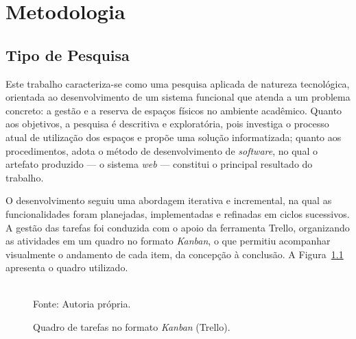 \chapter{Metodologia}\label{chp:METODOLOGIA}




\section{Tipo de Pesquisa}\label{sec:tipoPesquisa}


Este trabalho caracteriza-se como uma pesquisa aplicada de natureza tecnológica, orientada ao desenvolvimento de um sistema funcional que atenda a um problema concreto: a gestão e a reserva de espaços físicos no ambiente acadêmico. Quanto aos objetivos, a pesquisa é descritiva e exploratória, pois investiga o processo atual de utilização dos espaços e propõe uma solução informatizada; quanto aos procedimentos, adota o método de desenvolvimento de \textit{software}, no qual o artefato produzido — o sistema \textit{web} — constitui o principal resultado do trabalho.

O desenvolvimento seguiu uma abordagem iterativa e incremental, na qual as funcionalidades foram planejadas, implementadas e refinadas em ciclos sucessivos. A gestão das tarefas foi conduzida com o apoio da ferramenta Trello, organizando as atividades em um quadro no formato \textit{Kanban}, o que permitiu acompanhar visualmente o andamento de cada item, da concepção à conclusão. A Figura~\ref{fig:trello} apresenta o quadro utilizado.

\begin{figure}[H]
  \centering
  \framebox[0.85\textwidth]{\rule{0pt}{6cm}}%
  \caption{Quadro de tarefas no formato \textit{Kanban} (Trello).}
  \label{fig:trello}\\
  {\footnotesize Fonte: Autoria própria.}
\end{figure}

